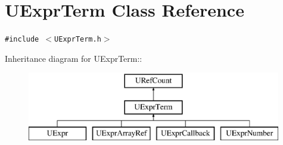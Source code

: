 \hypertarget{class_u_expr_term}{
\section{UExprTerm Class Reference}
\label{class_u_expr_term}
}
{\tt \#include $<$UExprTerm.h$>$}

Inheritance diagram for UExprTerm::\begin{figure}[H]
\begin{center}
\leavevmode
\includegraphics[height=3cm]{class_u_expr_term}
\end{center}
\end{figure}
